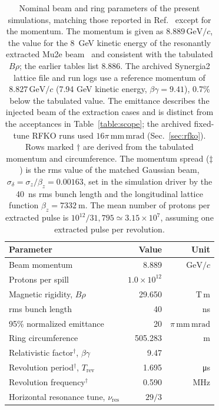 \documentclass[a4paper,fleqn]{cas-sc}
\begin{document}
\begin{table}[width=\linewidth,cols=3,pos=htbp]
  \caption{\label{table:param}Nominal beam and ring parameters of the present simulations, matching those reported in Ref.~\cite{mu2e} except for the momentum. The momentum is given as $8.889\,\mathrm{GeV}/c$, the value for the \SI{8}{GeV} kinetic energy of the resonantly extracted Mu2e beam~\cite{tdr} and consistent with the tabulated $B\rho$; the earlier tables list 8.886. The archived Synergia2 lattice file and run logs use a reference momentum of $8.827\,\mathrm{GeV}/c$ (7.94 GeV kinetic energy, $\beta\gamma=9.41$), 0.7\% below the tabulated value. The emittance describes the injected beam of the extraction cases and is distinct from the acceptances in Table~\ref{table:scope}; the archived fixed-tune RFKO runs used $16\pi\,\mathrm{mm\,mrad}$ (Sec.~\ref{sec:rfko}). Rows marked $\dagger$ are derived from the tabulated momentum and circumference. The momentum spread ($\ddagger$) is the rms value of the matched Gaussian beam, $\sigma_\delta=\sigma_z/\beta_z=0.00163$, set in the simulation driver by the \SI{40}{ns} rms bunch length and the longitudinal lattice function $\beta_z=\SI{7332}{\metre}$. The mean number of protons per extracted pulse is $10^{12}/31{,}795 \simeq 3.15\times10^{7}$, assuming one extracted pulse per revolution.}
  \begin{tabular*}{\tblwidth}{@{} LRR@{}}
    \toprule
    Parameter & Value & Unit \\
    \midrule
    Beam momentum & 8.889 & $\mathrm{GeV}/c$ \\
    Protons per spill & $1.0\times10^{12}$ & \\
    Magnetic rigidity, $B\rho$ & 29.650 & $\mathrm{T\,m}$ \\
    rms bunch length & 40 & ns \\
    95\% normalized emittance & 20 & $\pi\,\mathrm{mm\,mrad}$ \\
    Ring circumference & 505.283 & m \\
    Relativistic factor$^{\dagger}$, $\beta\gamma$ & 9.47 & \\
    Revolution period$^{\dagger}$, $T_{\mathrm{rev}}$ & 1.695 & \si{\micro\second} \\
    Revolution frequency$^{\dagger}$ & 0.590 & MHz \\
    Horizontal resonance tune, $\nu_{\mathrm{res}}$ & $29/3$ & \\

\end{tabular*}
\end{table}
\end{document}
